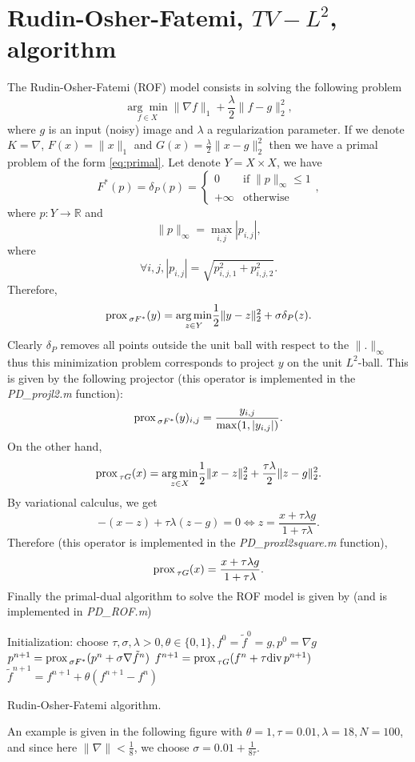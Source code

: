 \documentclass[letter,10pt]{article}
\def\R{{\mathbb{R}}}
\def\Div{\textup{div\,}}
\def\prox{\textup{prox\,}}
\begin{document}
\section{Rudin-Osher-Fatemi, $TV-L^2$, algorithm}\label{sec:rof}
The Rudin-Osher-Fatemi (ROF) model consists in solving the following problem
$$\underset{f\in X}{\arg\min}\|\nabla f\|_1+\frac{\lambda}{2}\|f-g\|_2^2,$$
where $g$ is an input (noisy) image and $\lambda$ a regularization parameter. If we denote $K=\nabla$, $F(x)=\|x\|_1$ and $G(x)=\frac{\lambda}{2}\|x-g\|_2^2$ then we have a primal problem of the form \eqref{eq:primal}. Let denote $Y=X\times X$, we have
$$F^*(p)=\delta_P(p)=\begin{cases} 0\quad&\text{if}\; \|p\|_\infty\leq 1\\ +\infty &\text{otherwise}\end{cases},$$
where $p:Y\to\R$ and $$\|p\|_\infty=\max_{i,j}|p_{i,j}|,$$
where $$\forall i,j,|p_{i,j}|=\sqrt{p_{i,j,1}^2+p_{i,j,2}^2}.$$
Therefore,
$$\prox_{\sigma F^*}(y)=\underset{z\in Y}{\arg\min}\frac{1}{2}\|y-z\|_2^2+\sigma\delta_P(z).$$
Clearly $\delta_P$ removes all points outside the unit ball with respect to the $\|.\|_\infty$ thus this minimization problem corresponds to project $y$ on the unit $L^2$-ball. 
This is given by the following projector (this operator is implemented in the \textit{PD\_projl2.m} function):
$$\prox_{\sigma F^*}(y)_{i,j}=\frac{y_{i,j}}{\max(1,|y_{i,j}|)}.$$
On the other hand,
$$\prox_{\tau G}(x)=\underset{z\in X}{\arg\min}\frac{1}{2}\|x-z\|_2^2+\frac{\tau\lambda}{2}\|z-g\|_2^2.$$
By variational calculus, we get
$$-(x-z)+\tau\lambda(z-g)=0 \Leftrightarrow z=\frac{x+\tau\lambda g}{1+\tau\lambda}.$$
Therefore (this operator is implemented in the \textit{PD\_proxl2square.m} function),
$$\prox_{\tau G}(x)=\frac{x+\tau\lambda g}{1+\tau\lambda}.$$
Finally the primal-dual algorithm to solve the ROF model is given by (and is implemented in \textit{PD\_ROF.m})
\begin{algorithm}[H]
\begin{algorithmic}
\STATE Initialization: choose $\tau,\sigma,\lambda>0,\theta\in\{0,1\},f^0=\tilde{f}^0=g,p^0=\nabla g$
\REPEAT 
\STATE $p^{n+1}=\prox_{\sigma F^*}(p^n+\sigma \nabla\tilde{f}^n)$
\STATE $f^{n+1}=\prox_{\tau G}(f^n+\tau \Div p^{n+1})$
\STATE $\tilde{f}^{n+1}=f^{n+1}+\theta(f^{n+1}-f^n)$
\end{algorithmic}
\caption{Rudin-Osher-Fatemi algorithm.}
\end{algorithm}
An example is given in the following figure with $\theta=1,\tau=0.01,\lambda=18,N=100$, and since here $\|\nabla\|<\frac{1}{8}$, we choose $\sigma=0.01+\frac{1}{8\tau}$.
\end{document}
